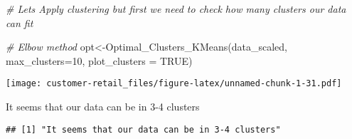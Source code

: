 \documentclass[
]{article}
\newenvironment{Shaded}{\begin{snugshade}}{\end{snugshade}}
\newcommand{\AttributeTok}[1]{\textcolor[rgb]{0.77,0.63,0.00}{#1}}
\newcommand{\CommentTok}[1]{\textcolor[rgb]{0.56,0.35,0.01}{\textit{#1}}}
\newcommand{\ConstantTok}[1]{\textcolor[rgb]{0.00,0.00,0.00}{#1}}
\newcommand{\ControlFlowTok}[1]{\textcolor[rgb]{0.13,0.29,0.53}{\textbf{#1}}}
\newcommand{\DecValTok}[1]{\textcolor[rgb]{0.00,0.00,0.81}{#1}}
\newcommand{\FunctionTok}[1]{\textcolor[rgb]{0.00,0.00,0.00}{#1}}
\newcommand{\NormalTok}[1]{#1}
\newcommand{\OtherTok}[1]{\textcolor[rgb]{0.56,0.35,0.01}{#1}}
\newcommand{\SpecialCharTok}[1]{\textcolor[rgb]{0.00,0.00,0.00}{#1}}
\newcommand{\StringTok}[1]{\textcolor[rgb]{0.31,0.60,0.02}{#1}}
\begin{document}
\begin{Shaded}
\begin{Highlighting}[]
\CommentTok{\# Let\textquotesingle{}s Apply clustering but first we need to check how many clusters our data can fit }

\CommentTok{\# Elbow method}
\NormalTok{opt}\OtherTok{\textless{}{-}}\FunctionTok{Optimal\_Clusters\_KMeans}\NormalTok{(data\_scaled, }\AttributeTok{max\_clusters=}\DecValTok{10}\NormalTok{, }\AttributeTok{plot\_clusters =} \ConstantTok{TRUE}\NormalTok{)}
\end{Highlighting}
\end{Shaded}

\texttt{[image: customer-retail\_files/figure-latex/unnamed-chunk-1-31.pdf]}

\begin{Shaded}
\begin{Highlighting}[]
\StringTok{\textquotesingle{}It seems that our data can be in 3{-}4 clusters\textquotesingle{}}
\end{Highlighting}
\end{Shaded}

\begin{verbatim}
## [1] "It seems that our data can be in 3-4 clusters"
\end{verbatim}

\begin{Shaded}
\end{Shaded}
\end{document}
